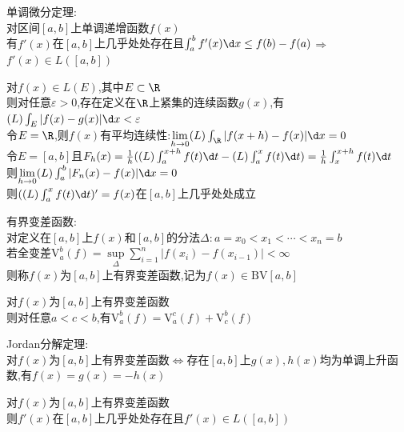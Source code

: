 \begin{dingli}
单调微分定理:\\
对区间$[a,b]$上单调递增函数$f(x)$\\
有$f'(x)$在$[a,b]$上几乎处处存在且$\int_{a}^{b}f'(x)\d x\leq f(b)-f(a)$$\Rightarrow$$f'(x)\in L([a,b])$
\end{dingli}

\begin{dingli}
对$f(x)\in L(E)$,其中$E\subset \R$\\
则对任意$\varepsilon>0$,存在定义在$\R$上紧集的连续函数$g(x)$,有$(L)\int_{E}|f(x)-g(x)|\d x <\varepsilon$\\
令$E=\R$,则$f(x)$有平均连续性:$\lim\limits_{h\to 0}(L)\int_{\R}|f(x+h)-f(x)|\d x=0$\\
令$E=[a,b]$且$F_h(x)=\frac{1}{h}((L)\int_{a}^{x+h}f(t)\d t-(L)\int_{a}^{x}f(t)\d t)=\frac{1}{h}\int_{x}^{x+h}f(t)\d t$\\
则$\lim\limits_{h\to 0}(L)\int_{a}^{b}|F_n(x)-f(x)|\d x=0$\\
则$((L)\int_{a}^{x}f(t)\d t)'=f(x)$在$[a,b]$上几乎处处成立
\end{dingli}

\begin{dingyi}
有界变差函数:\\
对定义在$[a,b]$上$f(x)$和$[a,b]$的分法$\Delta:a=x_0<x_1<\cdots<x_n=b$\\
若全变差$\mathrm{V}_{a}^{b}(f)=\sup\limits_{\Delta}\sum\limits_{i=1}^{n}|f(x_i)-f(x_{i-1})|<\infty$\\
则称$f(x)$为$[a,b]$上有界变差函数,记为$f(x)\in \mathrm{BV}[a,b]$
\end{dingyi}

\begin{dingli}
对$f(x)$为$[a,b]$上有界变差函数\\
则对任意$a<c<b$,有$\mathrm{V}_{a}^{b}(f)=\mathrm{V}_{a}^{c}(f)+\mathrm{V}_{c}^{b}(f)$
\end{dingli}

\begin{dingli}
Jordan分解定理:\\
对$f(x)$为$[a,b]$上有界变差函数$\Leftrightarrow$存在$[a,b]$上$g(x),h(x)$均为单调上升函数,有$f(x)=g(x)=-h(x)$
\end{dingli}

\begin{tuilun}
对$f(x)$为$[a,b]$上有界变差函数\\
则$f'(x)$在$[a,b]$上几乎处处存在且$f'(x)\in L([a,b])$
\end{tuilun}

